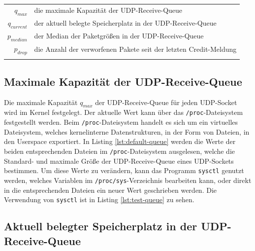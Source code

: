 \documentclass[a4paper, 12pt, BCOR10mm, DIV12, toc=bibliography, toc=listof, german]{scrbook}
\begin{document}
		\begin{tabular}{rl}
			$q_{max}$		  & die maximale Kapazität der UDP-Receive-Queue\\
			$q_{current}$ &	der aktuell belegte Speicherplatz in der UDP-Receive-Queue\\
			$p_{median}$  &	der Median der Paketgrößen in der UDP-Receive-Queue\\
			$p_{drop}$    &	die Anzahl der verworfenen Pakete seit der letzten Credit-Meldung\\
										& \\
		\end{tabular}

		\subsection*{Maximale Kapazität der UDP-Receive-Queue} %

		
		

		Die maximale Kapazität $q_{max}$ der UDP-Receive-Queue für jeden UDP-Socket wird im Kernel festgelegt. Der
		aktuelle Wert kann über das \texttt{/proc}-Dateisystem festgestellt werden. Beim
		\texttt{/proc}-Dateisystem \cite{benvenuti2005} handelt es sich um ein virtuelles Dateisystem,
		welches kernelinterne Datenstrukturen, in der Form von Dateien, in den Userspace exportiert. In
		Listing \ref{lst:default-queue} werden die Werte der beiden entsprechenden Dateien im
		\texttt{/proc}-Dateisystem ausgelesen, welche die Standard- und maximale Größe der
		UDP-Receive-Queue eines UDP-Sockets bestimmen. Um diese Werte zu verändern, kann das Programm
		\texttt{sysctl} genutzt werden, welches Variablen im \texttt{/proc/sys}-Verzeichnis bearbeiten
		kann, oder direkt in die entsprechenden Dateien ein neuer Wert geschrieben werden. Die
		Verwendung von \texttt{sysctl} ist in Listing \ref{lst:test-queue} zu sehen.


		\subsection*{Aktuell belegter Speicherplatz in der UDP-Receive-Queue} %
\end{document}
